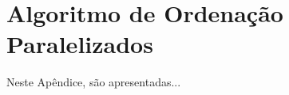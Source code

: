 
\chapter{Algoritmo de Ordenação Paralelizados}
\label{apd:5:complementacao}

Neste Apêndice, são apresentadas...


